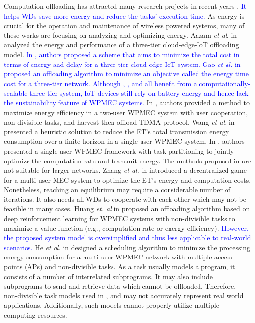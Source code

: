 \documentclass[12pt,draftclsnofoot,onecolumn]{IEEEtran}
\begin{document}
Computation offloading has attracted many research projects in recent years \cite{b5,b39,b40,b11,b13,b29,b26,b28,b32}. \textcolor{blue}{It helps WDs save more energy and reduce the tasks' execution time.} As energy is crucial for the operation and maintenance of wireless powered systems, many of these works are focusing on analyzing and optimizing energy. Aazam \textit{et al.} in \cite{b5} analyzed the energy and performance of a three-tier cloud-edge-IoT offloading model. \textcolor{blue}{In \cite{b39}, authors proposed a scheme that aims to minimize the total cost in terms of energy and delay for a three-tier cloud-edge-IoT system. Gao \textit{et al.} in \cite{b40} proposed an offloading algorithm to minimize an objective called the energy time cost for a three-tier network. Although \cite{b5}, \cite{b39}, and \cite{b40} all benefit from a computationally-scalable three-tier system, IoT devices still rely on battery energy and hence lack the sustainability feature of WPMEC systems.} In \cite{b11}, authors provided a method to maximize energy efficiency in a two-user WPMEC system with user cooperation, non-divisible tasks, and harvest-then-offload TDMA protocol. Wang \textit{et al.} in \cite{b13} presented a heuristic solution to reduce the ET's total transmission energy consumption over a finite horizon in a single-user WPMEC system. In \cite{b29}, authors presented a single-user WPMEC framework with task partitioning to jointly optimize the computation rate and transmit energy. The methods proposed in \cite{b11,b13,b29} are not suitable for larger networks. Zhang \textit{et al.} in \cite{b26} introduced a decentralized game for a multi-user MEC system to optimize the ET's energy and computation costs. Nonetheless, reaching an equilibrium may require a considerable number of iterations. It also needs all WDs to cooperate with each other which may not be feasible in many cases. Huang \textit{et. al} in \cite{b28} proposed an offloading algorithm based on deep reinforcement learning for WPMEC systems with non-divisible tasks to maximize a value function (e.g., computation rate or energy efficiency). \textcolor{blue}{However, the proposed system model is oversimplified and thus less applicable to real-world scenarios.} He \textit{et al.} in \cite{b32} designed a scheduling algorithm to minimize the processing energy consumption for a multi-user WPMEC network with multiple access points (APs) and non-divisible tasks. As a task usually models a program, it consists of a number of interrelated subprograms. It may also include subprograms to send and retrieve data which cannot be offloaded. Therefore, non-divisible task models used in \cite{b11,b26,b28}, and \cite{b32} may not accurately represent real world applications. Additionally, such models cannot properly utilize multiple computing resources.
\end{document}
